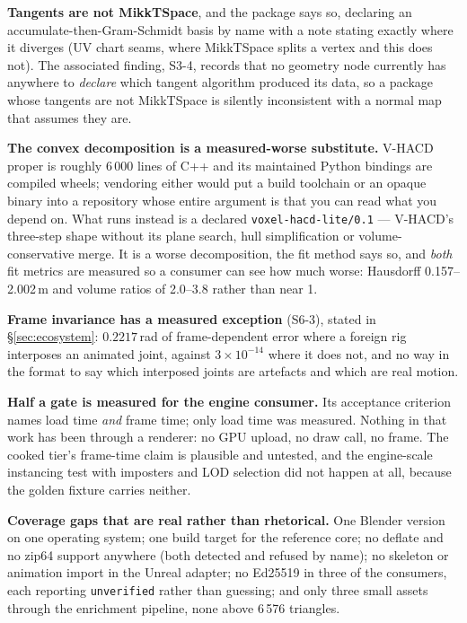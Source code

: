 \documentclass[10pt,twocolumn,letterpaper]{article}
\newcommand{\code}[1]{\texttt{\small #1}}
\begin{document}
\textbf{Tangents are not MikkTSpace}, and the package says so, declaring an
accumulate-then-Gram-Schmidt basis by name with a note stating exactly where it
diverges (UV chart seams, where MikkTSpace splits a vertex and this does not). The
associated finding, S3-4, records that no geometry node currently has anywhere to
\emph{declare} which tangent algorithm produced its data, so a package whose
tangents are not MikkTSpace is silently inconsistent with a normal map that assumes
they are.

\textbf{The convex decomposition is a measured-worse substitute.} V-HACD proper is
roughly 6\,000 lines of C++ and its maintained Python bindings are compiled wheels;
vendoring either would put a build toolchain or an opaque binary into a repository
whose entire argument is that you can read what you depend on. What runs instead is
a declared \code{voxel-hacd-lite/0.1} --- V-HACD's three-step shape without its
plane search, hull simplification or volume-conservative merge. It is a worse
decomposition, the fit method says so, and \emph{both} fit metrics are measured so
a consumer can see how much worse: Hausdorff 0.157--2.002\,m and volume ratios of
2.0--3.8 rather than near 1.

\textbf{Frame invariance has a measured exception} (S6-3), stated in
\S\ref{sec:ecosystem}: $0.2217$\,rad of frame-dependent error where a foreign rig
interposes an animated joint, against $3\times10^{-14}$ where it does not, and no
way in the format to say which interposed joints are artefacts and which are real
motion.

\textbf{Half a gate is measured for the engine consumer.} Its acceptance criterion
names load time \emph{and} frame time; only load time was measured. Nothing in that
work has been through a renderer: no GPU upload, no draw call, no frame. The
cooked tier's frame-time claim is plausible and untested, and the engine-scale
instancing test with imposters and LOD selection did not happen at all, because the
golden fixture carries neither.

\textbf{Coverage gaps that are real rather than rhetorical.} One Blender version on
one operating system; one build target for the reference core; no deflate and no
zip64 support anywhere (both detected and refused by name); no skeleton or
animation import in the Unreal adapter; no Ed25519 in three of the consumers, each
reporting \code{unverified} rather than guessing; and only three small assets
through the enrichment pipeline, none above 6\,576 triangles.
\end{document}
